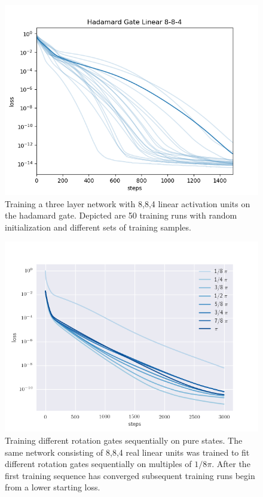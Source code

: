 \documentclass[a4paper]{article}
\begin{document}
\begin{figure}
\includegraphics[width=\linewidth]{../figures/8-4-4-traces/sweep_hadamard.png}
\caption{Training a three layer network with 8,8,4 linear activation units on the
hadamard gate. Depicted are 50 training runs with random initialization and different sets
of training samples.}
\label{fig:ltl}
\end{figure}


\begin{figure}
\includegraphics[width=\linewidth]{../figures/rotate_sequential.png}
\caption{Training different rotation gates sequentially on pure states. The same network consisting of 8,8,4 real linear units was trained to fit different rotation gates sequentially on multiples of $1/8 \pi.$ 
After the first training sequence has converged subsequent
training runs begin from a lower starting loss.}
\label{fig:ltl}
\end{figure}
\end{document}
